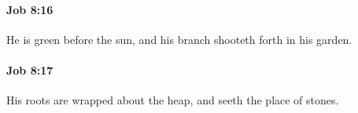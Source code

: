 		\paragraph{Job 8:16} %
			\label{JOB-8-16}

			He is green before the sun, and his branch shooteth forth in his garden.


		\paragraph{Job 8:17} %
			\label{JOB-8-17}

			His roots are wrapped about the heap, and seeth the place of stones.


